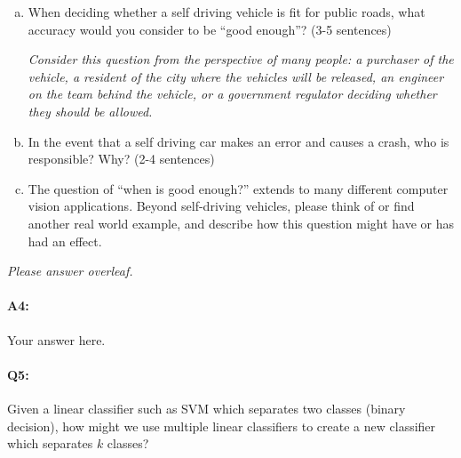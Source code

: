 \begin{enumerate}[(a)]
\item When deciding whether a self driving vehicle is fit for public roads, what accuracy would you consider to be ``good enough''?  (3-5 sentences)

\emph{Consider this question from the perspective of many people: a purchaser of the vehicle, a resident of the city where the vehicles will be released, an engineer on the team behind the vehicle, or a government regulator deciding whether they should be allowed.}

\item In the event that a self driving car makes an error and causes a crash, who is responsible? Why? (2-4 sentences)

\item The question of ``when is good enough?'' extends to many different computer vision applications. Beyond self-driving vehicles, please think of or find another real world example, and describe how this question might have or has had an effect.
\end{enumerate}

\emph{Please answer overleaf.}

\pagebreak
\paragraph{A4:} Your answer here.









\pagebreak
\paragraph{Q5:} Given a linear classifier such as SVM which separates two classes (binary decision), how might we use multiple linear classifiers to create a new classifier which separates $k$ classes?

